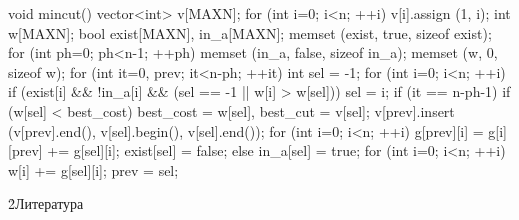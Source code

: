 void mincut() {
	vector<int> v[MAXN];
	for (int i=0; i<n; ++i)
		v[i].assign (1, i);
	int w[MAXN];
	bool exist[MAXN], in_a[MAXN];
	memset (exist, true, sizeof exist);
	for (int ph=0; ph<n-1; ++ph) {
		memset (in_a, false, sizeof in_a);
		memset (w, 0, sizeof w);
		for (int it=0, prev; it<n-ph; ++it) {
			int sel = -1;
			for (int i=0; i<n; ++i)
				if (exist[i] && !in_a[i] && (sel == -1 || w[i] > w[sel]))
					sel = i;
			if (it == n-ph-1) {
				if (w[sel] < best_cost)
					best_cost = w[sel],  best_cut = v[sel];
				v[prev].insert (v[prev].end(), v[sel].begin(), v[sel].end());
				for (int i=0; i<n; ++i)
					g[prev][i] = g[i][prev] += g[sel][i];
				exist[sel] = false;
			}
			else {
				in_a[sel] = true;
				for (int i=0; i<n; ++i)
					w[i] += g[sel][i];
				prev = sel;
			}
		}
	}
}
\endcode


\h2{Литература}

\ul{
\li {}
\li {}
}